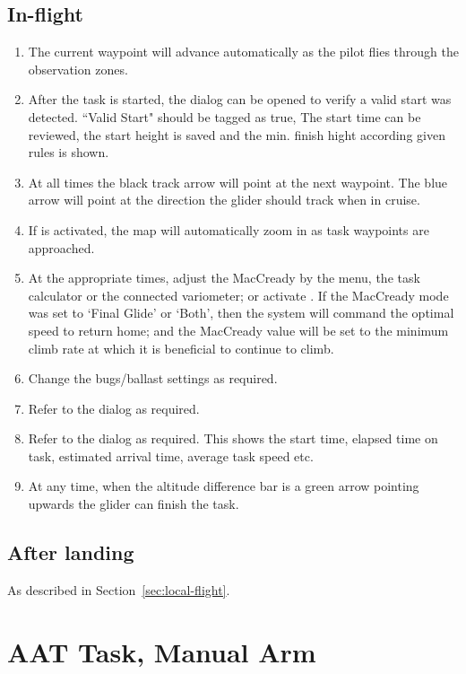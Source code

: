 \documentclass[a4paper,12pt]{refrep}
\begin{document}
\subsection*{In-flight}
\begin{enumerate}
\item  The current waypoint will advance automatically as the pilot flies
through the observation zones.  
\item  After the task is started, the  dialog can be opened to
verify a valid start was detected.  ``Valid Start" should be tagged as true,
The start time can be reviewed, the start height is saved and the min. finish
hight according given rules is shown.
\item  At all times the black track arrow will point at the next waypoint.  The
blue arrow will point at the direction the glider should track when in cruise.
\item  If  is activated, the map will automatically zoom in as
task waypoints are approached.
\item  At the appropriate times, adjust the MacCready by the menu,
the task calculator or the connected variometer; or activate .
If the MacCready mode was set to `Final Glide' or `Both', then the system will command the optimal 
speed to return home; and the MacCready value will be set to the minimum climb
rate at which it is beneficial to continue to climb.
\item  Change the bugs/ballast settings as required.
\item  Refer to the  dialog as required. 
\item  Refer to the  dialog as required.  This shows the start
time, elapsed time on task, estimated arrival time, average task speed etc.
\item  At any time, when the altitude difference bar is a green arrow pointing 
upwards the glider can finish the task.

\end{enumerate}

\subsection*{After landing}
As described in Section~\ref{sec:local-flight}.


\section{AAT Task, Manual Arm}\label{sec:aat-task-manual}
\end{document}
